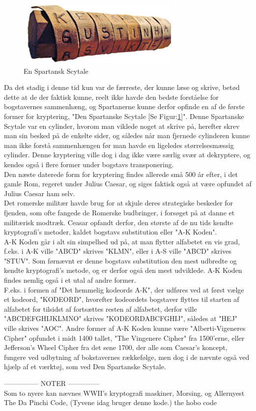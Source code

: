 \begin{figure}[H]
    \centering
    \includegraphics[scale=1.2]{Projectdoc/Problemanalyse/Illustrationer/Scytale.jpg}
    \caption{En Spartansk Scytale}
    \label{fig:scytale}
\end{figure}
\noindent
Da det stadig i denne tid kun var de færreste, der kunne læse og skrive, betød dette at de der faktisk kunne, reelt ikke havde den bedste forståelse for bogstavernes sammenhæng, og Spartanerne kunne derfor opfinde en af de første former for kryptering, "Den Spartanske Scytale [Se Figur:\ref{fig:scytale}]". Denne Spartanske Scytale var en cylinder, hvorom man viklede noget at skrive på, herefter skrev man sin besked på de enkelte sider, og således når man fjernede cylinderen kunne man ikke forstå sammenhængen før man havde en ligeledes størrelsesmæssig cylinder. Denne kryptering ville dog i dag ikke være særlig svær at dekryptere, og kendes også i flere former under bogstavs transponering.\\
Den næste daterede form for kryptering findes allerede små 500 år efter, i det gamle Rom, regeret under Julius Caesar, og siges faktisk også at være opfundet af Julius Caesar ham selv.\cite{PastCryptography}\\ 
Det romerske militær havde brug for at skjule deres strategiske beskeder for fjenden, som ofte fangede de Romerske budbringer, i forsøget på at danne et militærisk modtræk. Ceasar opfandt derfor, den største af de nu tids kendte kryptografi's metoder, kaldet bogstavs substitution eller "A-K Koden".\\
A-K Koden går i alt sin simpelhed ud på, at man flytter alfabetet en vis grad, f.eks. i A-K ville "ABCD" skrives "KLMN", eller i A-S ville "ABCD" skrives "STUV".\cite{TheSecretLanguage}
Som førnævnt er denne bogstavs substitution den mest udbredte og kendte kryptografi's metode, og er derfor også den mest udviklede. A-K Koden findes nemlig også i et utal af andre former.\\ 
F.eks. i formen af "Det hemmelig kodeords A-K", der udføres ved at først vælge et kodeord, "KODEORD", hvorefter kodeordets bogstaver flyttes til starten af alfabetet for tilsidst af fortsættes resten af alfabetet, derfor ville "ABCDEFGHIJKLMNO" skrives "KODEORDABCFGHIJ", således at "HEJ" ville skrives "AOC". \cite{TheSecretLanguage}
Andre former af A-K Koden kunne være "Alberti-Vigeneres Cipher" opfundet i midt 1400 tallet, "The Vingenere Cipher" fra 1500'erne, eller Jefferson's Wheel Cipher fra det sene 1700,\cite{PastCryptography} der alle som Caesar's koncept, fungere ved udbytning af bokstavernes rækkefølge, men dog i de nævnte også ved hjælp af et værktøj, som ved Den Spartanske Scytale.



--------------- NOTER --------------\\
Som to nyere kan nævnes WWII's kryptografi maskiner, Morsing, og
Allernyest The Da Pinchi Code, (Tyvene idag bruger denne kode.) the hobo code